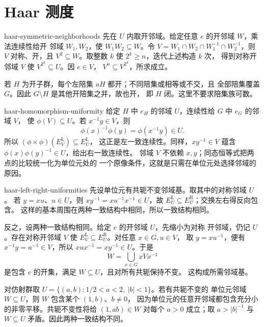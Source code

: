 \chapter{Haar 测度}

\begin{solution}{haar-symmetric-neighborhoods}
先在 $U$ 内取开邻域。给定任意 $e$ 的开邻域 $W$，乘法连续性给开
邻域 $W_1,W_2$，使 $W_1W_2\subseteq W$。令
$V=W_1\cap W_2\cap W_1^{-1}\cap W_2^{-1}$，则 $V$ 对称、开，且
$V^2\subseteq W$。取整数 $k$ 使 $2^k\ge n$，迭代上述构造 $k$ 次，
得到对称开邻域 $V$ 使 $V^{2^k}\subseteq U$。因 $e\in V$，
$V^n\subseteq V^{2^k}$，所求成立。

若 $H$ 为开子群，每个左陪集 $aH$ 都开；不同陪集或相等或不交，且
全部陪集覆盖 $G$。因此 $G\setminus H$ 是其他开陪集之并，故也开，
即 $H$ 闭。这里不要求陪集族可数。
\end{solution}

\begin{solution}{haar-homomorphism-uniformity}
给定 $H$ 中 $e_H$ 的邻域 $U$，连续性给 $G$ 中 $e_G$ 的邻域 $V$，
使 $\phi(V)\subseteq U$。若 $x^{-1}y\in V$，则
\[
 \phi(x)^{-1}\phi(y)=\phi(x^{-1}y)\in U.
\]
所以 $(\phi\times\phi)(E_V^{\mathrm L})\subseteq E_U^{\mathrm L}$，
这正是左一致连续性。同样，$xy^{-1}\in V$ 蕴含
$\phi(x)\phi(y)^{-1}\in U$，给出右一致连续性。
邻域 $V$ 不依赖 $x,y$；同态恒等式把两点的比较统一化为单位元处的
一个原像条件，这就是只需在单位元处选择邻域的原因。
\end{solution}

\begin{solution}{haar-left-right-uniformities}
先设单位元有共轭不变邻域基。取其中的对称邻域 $U$。
若 $y=xu$、$u\in U$，则 $xy^{-1}=xu^{-1}x^{-1}\in U$，故
$E_U^{\mathrm L}\subseteq E_U^{\mathrm R}$；交换左右得反向包含。
这样的基本周围在两种一致结构中相同，所以一致结构相同。

反之，设两种一致结构相同。给定 $e$ 的开邻域 $U$，先缩小为对称
开邻域，仍记 $U$。存在对称开邻域 $V$ 使
$E_V^{\mathrm L}\subseteq E_U^{\mathrm R}$。对任意 $x\in G,u\in V$，
取 $y=xu^{-1}$，便有 $x^{-1}y=u^{-1}\in V$，所以
$xux^{-1}=xy^{-1}\in U$。于是
\[
 W=\bigcup_{x\in G}xVx^{-1}
\]
是包含 $e$ 的开集，满足 $W\subseteq U$，且对所有共轭保持不变。
这构成所需邻域基。

对仿射群取 $U=\{(a,b):1/2<a<2,\ |b|<1\}$。若有共轭不变的
单位元邻域 $W\subseteq U$，则 $W$ 包含某个 $(1,b)$、$b\ne0$，
因为单位元的任意开邻域都包含充分小的非零平移。共轭不变性将给
$(1,ab)\in W$ 对每个 $a>0$ 成立；取 $a>|b|^{-1}$ 与
$W\subseteq U$ 矛盾。因此两种一致结构不同。
\end{solution}

